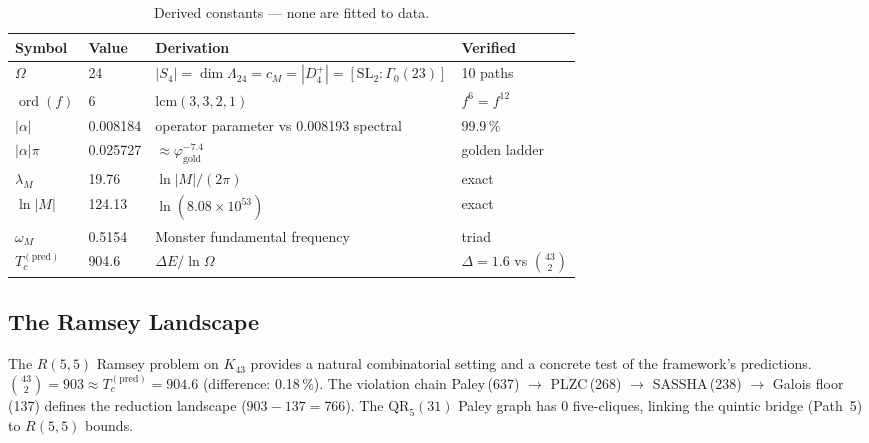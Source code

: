 \documentclass[11pt,a4paper]{article}
\theoremstyle{plain}
\theoremstyle{remark}
\renewcommand{\Omega}{\varOmega}
\newcommand{\ord}{\operatorname{ord}}
\begin{document}
\begin{table}[H]
\centering\small
\setlength{\tabcolsep}{5pt}
\begin{tabular}{@{}llll@{}}
\toprule
Symbol & Value & Derivation & Verified\\
\midrule
$\Omega$   & 24       & $|S_4|=\dim\Lambda_{24}=c_M=|D_4^+|=[\mathrm{SL}_2:\Gamma_0(23)]$ & 10 paths\\
$\ord(f)$ & 6 & $\mathrm{lcm}(3,3,2,1)$ & $f^6=f^{12}$\\
$|\alpha|$ & 0.008184 & operator parameter vs 0.008193 spectral & 99.9\,\%\\
$|\alpha|\pi$ & 0.025727 & $\approx\varphi_{\mathrm{gold}}^{-7.4}$ & golden ladder\\
$\lambda_M$ & 19.76 & $\ln|M|/(2\pi)$ & exact\\
$\ln|M|$ & 124.13 & $\ln(8.08\times 10^{53})$ & exact\\
$\omega_M$ & 0.5154 & Monster fundamental frequency & triad\\
$T_c^{(\mathrm{pred})}$ & 904.6 & $\Delta E/\ln\Omega$ & $\Delta=1.6$ vs $\binom{43}{2}$\\
\bottomrule
\end{tabular}
\caption{Derived constants --- none are fitted to data.}
\label{tab:constants}
\end{table}

\subsection{The Ramsey Landscape}
\label{sec:ramsey}

The $R(5,5)$ Ramsey problem on $K_{43}$ provides a natural combinatorial
setting and a concrete test of the framework's predictions.
$\binom{43}{2}=903\approx T_c^{(\mathrm{pred})}=904.6$
(difference: 0.18\,\%).  The violation chain
Paley\,(637) $\to$ PLZC\,(268) $\to$ SASSHA\,(238) $\to$
Galois floor\,(137) defines the reduction landscape ($903-137=766$).
The $\mathrm{QR}_5(31)$ Paley graph has 0 five-cliques, linking the
quintic bridge (Path~5) to $R(5,5)$ bounds.
\end{document}
